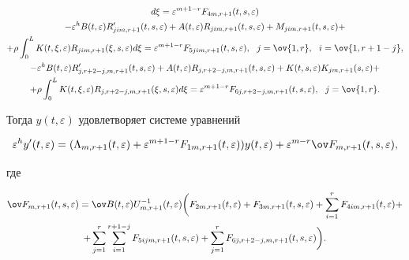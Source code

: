 \begin{gather*}
d\xi=\varepsilon^{m+1-r}F_{4m,r+1}(t,s,\varepsilon) \\ 


% 


-\varepsilon^h B(t,\varepsilon)R'_{jim,r+1}(t,s,\varepsilon)+ 


A(t,\varepsilon)R_{jim,r+1}(t,s,\varepsilon)+ 


M_{jim,r+1}(t,s,\varepsilon)+ \\ 


% 


+\rho\int^L_0 K(t,\xi,\varepsilon)R_{jim,r+1}(\xi,s,\varepsilon) 


d\xi=\varepsilon^{m+1-r}F_{5jim,r+1}(t,s,\varepsilon), 


\ \ j=\ov{1,r},\ \ i=\ov{1,r+1-j}, \\ 


% 


-\varepsilon^h B(t,\varepsilon)R'_{j,r+2-j,m,r+1} 


(t,s,\varepsilon)+A(t,\varepsilon)R_{j,r+2-j,m,r+1} 


(t,s,\varepsilon)+K(t,s,\varepsilon) 


K_{jm,r+1}(s,\varepsilon)+ \\ 


% 


+\rho\int^L_0 K(t,\xi,\varepsilon)R_{j,r+2-j,m,r+1} 


(\xi,s,\varepsilon)d\xi=\varepsilon^{m+1-r} 


F_{6j,r+2-j,m,r+1}(t,s,\varepsilon),\ \ j=\ov{1,r}. 


\end{gather*} 


Тогда $y(t,\varepsilon)$ удовлетворяет системе уравнений 


\begin{equation} 


\varepsilon^h y'(t,\varepsilon)=(\Lambda_{m,r+1}(t,\varepsilon) 


+\varepsilon^{m+1-r}F_{1m,r+1}(t,\varepsilon)) 


y(t,\varepsilon)+\varepsilon^{m-r} 


\ov F_{m,r+1}(t,s,\varepsilon), 


\end{equation} 


где 


\begin{multline*} 


\ov F_{m,r+1}(t,s,\varepsilon)=\ov B(t,\varepsilon) 


U^{-1}_{m,r+1}(t,\varepsilon)\bigg(F_{2m,r+1}(t,\varepsilon)+ 


F_{3m,r+1}(t,s,\varepsilon)+\sum^r_{i=1} 


F_{4im,r+1}(t,\varepsilon)+ \\ 


% 


+\sum^r_{j=1}\sum^{r+1-j}_{i=1}F_{5ijm,r+1}(t,s,\varepsilon) 


+\sum^r_{j=1}F_{6j,r+2-j,m,r+1}(t,s,\varepsilon)\bigg). 


\end{multline*} 


